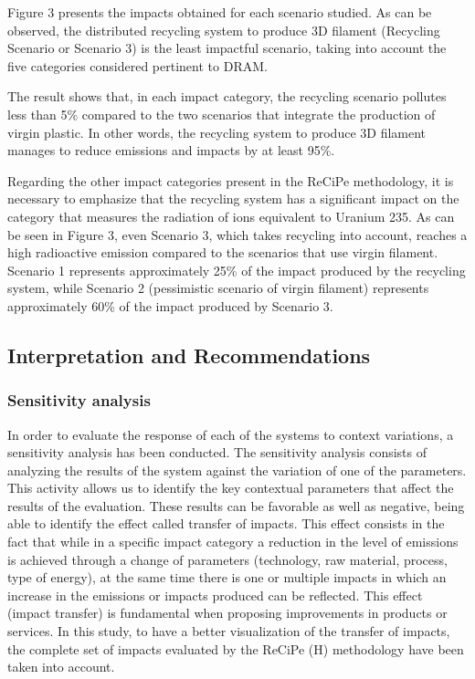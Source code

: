 \documentclass[]{elsarticle} %
\begin{document}
Figure 3 presents the impacts obtained for each scenario studied. As can be observed, the distributed recycling system to produce 3D filament (Recycling Scenario or Scenario 3) is the least impactful scenario, taking into account the five categories considered pertinent to DRAM.

The result shows that, in each impact category, the recycling scenario pollutes less than 5\% compared to the two scenarios that integrate the production of virgin plastic. In other words, the recycling system to produce 3D filament manages to reduce emissions and impacts by at least 95\%.

Regarding the other impact categories present in the ReCiPe methodology, it is necessary to emphasize that the recycling system has a significant impact on the category that measures the radiation of ions equivalent to Uranium 235. As can be seen in Figure 3, even Scenario 3, which takes recycling into account, reaches a high radioactive emission compared to the scenarios that use virgin filament. Scenario 1 represents approximately 25\% of the impact produced by the recycling system, while Scenario 2 (pessimistic scenario of virgin filament) represents approximately 60\% of the impact produced by Scenario 3.

\hypertarget{interpretation-and-recommendations}{%
\subsection{Interpretation and Recommendations}\label{interpretation-and-recommendations}}

\hypertarget{sensitivity-analysis}{%
\subsubsection{Sensitivity analysis}\label{sensitivity-analysis}}

In order to evaluate the response of each of the systems to context variations, a sensitivity analysis has been conducted. The sensitivity analysis consists of analyzing the results of the system against the variation of one of the parameters. This activity allows us to identify the key contextual parameters that affect the results of the evaluation. These results can be favorable as well as negative, being able to identify the effect called transfer of impacts. This effect consists in the fact that while in a specific impact category a reduction in the level of emissions is achieved through a change of parameters (technology, raw material, process, type of energy), at the same time there is one or multiple impacts in which an increase in the emissions or impacts produced can be reflected. This effect (impact transfer) is fundamental when proposing improvements in products or services.
In this study, to have a better visualization of the transfer of impacts, the complete set of impacts evaluated by the ReCiPe (H) methodology have been taken into account.
\end{document}
